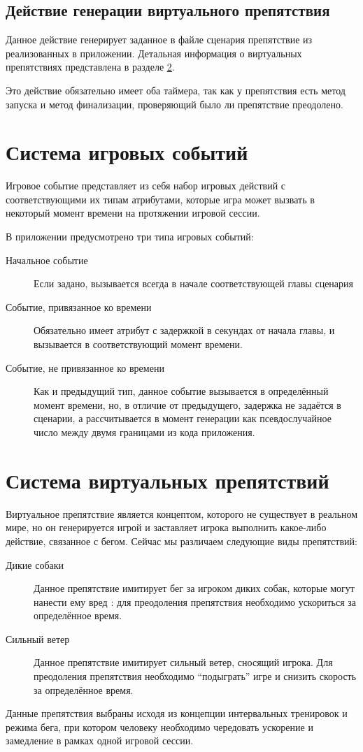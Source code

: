 \subsection*{Действие генерации виртуального препятствия}
Данное действие генерирует заданное в файле сценария препятствие из реализованных в приложении. Детальная информация о виртуальных препятствиях представлена в разделе \ref{sec:obstacles}.

Это действие обязательно имеет оба таймера, так как у препятствия есть метод запуска и метод финализации, проверяющий было ли препятствие преодолено.
 
\section{Система игровых событий}
\label{sec:events}
Игровое событие представляет из себя набор игровых действий с соответствующими их типам атрибутами, которые игра может вызвать в некоторый момент времени на протяжении игровой сессии.

В приложении предусмотрено три типа игровых событий:
\begin{description}
	\item [Начальное событие] Если задано, вызывается всегда в начале соответствующей главы сценария
	\item [Событие, привязанное ко времени] Обязательно имеет атрибут с задержкой в секундах от начала главы, и вызывается в соответствующий момент времени.
	\item [Событие, не привязанное ко времени] Как и предыдущий тип, данное событие вызывается в определённый момент времени, но, в отличие от предыдущего, задержка не задаётся в сценарии, а рассчитывается в момент генерации как псевдослучайное число между двумя границами из кода приложения.
\end{description}


\section{Система виртуальных препятствий}
\label{sec:obstacles}
Виртуальное препятствие является концептом, которого не существует в реальном мире, но он генерируется игрой и заставляет игрока выполнить какое-либо действие, связанное с бегом. Сейчас мы различаем следующие виды препятствий:
\begin{description}
	\item[Дикие собаки] Данное препятствие имитирует бег за игроком диких собак, которые могут нанести ему вред : для преодоления препятствия необходимо ускориться за определённое время.
	\item[Сильный ветер] Данное препятствие имитирует сильный ветер, сносящий игрока. Для преодоления препятствия необходимо ``подыграть'' игре и снизить скорость за определённое время.
\end{description}
\smallskip
Данные препятствия выбраны исходя из концепции интервальных тренировок и режима бега, при котором человеку необходимо чередовать ускорение и замедление в рамках одной игровой сессии.

